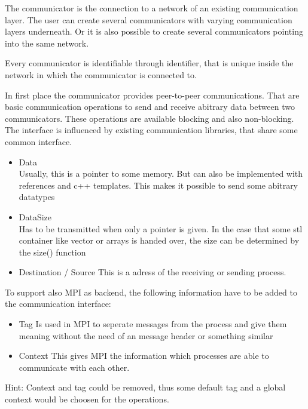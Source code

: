 The communicator is the connection to a network of an existing
communication layer. The user can create several communicators with
varying communication layers underneath. Or it is also possible to
create several communicators pointing into the same network.

Every communicator is identifiable through identifier, that is unique
inside the network in which the communicator is connected to.

In first place the communicator provides peer-to-peer
communications. That are basic communication operations to send and
receive abitrary data between two communicators. These operations are
available blocking and also non-blocking.  The interface is influenced
by existing communication libraries, that share some common interface.

\begin{itemize}
  \item Data \\ Usually, this is a pointer to some memory.  But can
    also be implemented with references and c++ templates.  This makes
    it possible to send some abitrary datatypes
  \item DataSize\\ Has to be transmitted when only a pointer is
    given. In the case that some stl container like vector or arrays
    is handed over, the size can be determined by the size() function
  \item Destination / Source This is a adress of the receiving or
    sending process.
    
\end{itemize}

To support also MPI as backend, the following information have to be
added to the communication interface:

\begin{itemize}
  \item Tag Is used in MPI to seperate messages from the process and
    give them meaning without the need of an message header or
    something similar
  \item Context This gives MPI the information which processes are
    able to communicate with each other.
    
\end{itemize}

Hint: Context and tag could be removed, thus some default tag and a
global context would be choosen for the operations.



